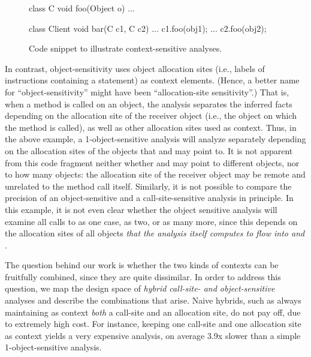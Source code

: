 \begin{figure}[h]
\begin{javacode}
class C {
 void foo(Object o) { ... }
}

class Client {
 void bar(C c1, C c2) { ...
  c1.foo(obj1);
  ...
  c2.foo(obj2);
 }
} 
\end{javacode}
\caption{Code snippet to illustrate context-sensitive analyses.}
\end{figure}

In contrast, object-sensitivity uses object allocation sites (i.e.,
labels of instructions containing a  statement) as context
elements. (Hence, a better name for ``object-sensitivity'' might have
been ``allocation-site sensitivity''.) That is, when a method is
called on an object, the analysis separates the inferred facts
depending on the allocation site of the receiver object (i.e., the
object on which the method is called), as well as other allocation
sites used as context. Thus, in the above example, a
1-object-sensitive analysis will analyze  separately depending
on the allocation sites of the objects that  and  may
point to. It is not apparent from this code fragment neither whether
 and  may point to different objects, nor to how many
objects: the allocation site of the receiver object may be remote and
unrelated to the method call itself. Similarly, it is not possible to
compare the precision of an object-sensitive and a call-site-sensitive
analysis in principle. In this example, it is not even clear whether
the object sensitive analysis will examine all calls to  as
one case, as two, or as many more, since this depends on the
allocation sites of all objects \emph{that the analysis itself computes to
flow into  and }.

The question behind our work is whether the two kinds of contexts can
be fruitfully combined, since they are quite dissimilar. In order to
address this question, we map the design space of \emph{hybrid
  call-site- and object-sensitive} analyses and describe the
combinations that arise. Naive hybrids, such as always maintaining as
context \emph{both} a call-site and an allocation site, do not pay
off, due to extremely high cost. For instance, keeping one call-site
and one allocation site as context yields a very expensive analysis,
on average 3.9x slower than a simple 1-object-sensitive analysis.


